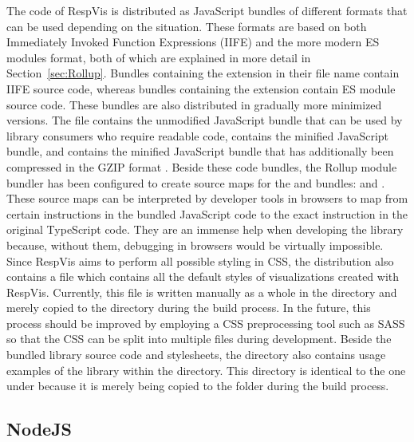 The code of RespVis is distributed as JavaScript bundles of different formats that can be used depending on the situation.
These formats are based on both Immediately Invoked Function Expressions (IIFE) and the more modern ES modules format, both of which are explained in more detail in Section~\ref{sec:Rollup}.
Bundles containing the  extension in their file name contain IIFE source code, whereas bundles containing the  extension contain ES module source code.  
These bundles are also distributed in gradually more minimized versions.
The  file contains the unmodified JavaScript bundle that can be used by library consumers who require readable code,  contains the minified JavaScript bundle, and  contains the minified JavaScript bundle that has additionally been compressed in the GZIP format \parencite{GZIP}.
Beside these code bundles, the Rollup module bundler has been configured to create source maps for the  and  bundles:  and .
These source maps can be interpreted by developer tools in browsers to map from certain instructions in the bundled JavaScript code to the exact instruction in the original TypeScript code.
They are an immense help when developing the library because, without them, debugging in browsers would be virtually impossible.
Since RespVis aims to perform all possible styling in CSS, the distribution also contains a  file which contains all the default styles of visualizations created with RespVis. 
Currently, this file is written manually as a whole in the  directory and merely copied to the  directory during the build process.
In the future, this process should be improved by employing a CSS preprocessing tool such as SASS \parencite{SASS} so that the CSS can be split into multiple files during development.
Beside the bundled library source code and stylesheets, the  directory also contains usage examples of the library within the  directory.
This directory is identical to the one under  because it is merely being copied to the  folder during the build process.


\subsection{NodeJS}

